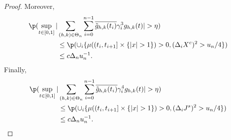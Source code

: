 \begin{proof}
Moreover, 
\begin{align}
\p( \sup_{t \in \domain}\vert &\sumt \sumin \btghki \gamma^3_i  \ghk(t)\vert > \eta) \notag \\
&\le \p(    \cup_i\{ \mu( (t_i, t_{i+1}] \times \{\vert x \vert > 1 \} ) > 0,  (\dxc)^2 > u_n/4\}) \notag \\ & \le c \Delta_n u_n^{-1}. \label{eq:g3}\end{align}
Finally,
\begin{align}
\p( \sup_{t \in \domain}\vert &\sumt \sumin \btghki \gamma^4_i  \ghk(t)\vert > \eta) \notag \\
&\le \p(    \cup_i\{ \mu( (t_i, t_{i+1}] \times \{\vert x \vert > 1 \} ) > 0,  (\djt)^2 > u_n/4\}) \notag \\ & \le c \Delta_n u_n^{-1}.\label{eq:g4}\end{align}
\begin{comment}


\end{comment}
\end{proof}
